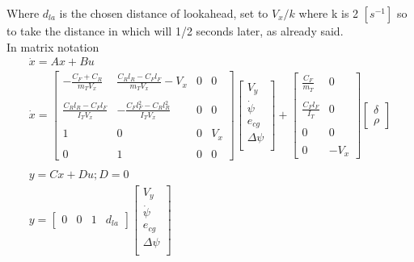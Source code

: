\documentclass{report}
\begin{document}
Where $d_{la}$ is the chosen distance of lookahead, set to $V_x/k$ where k is 2 $[s^{-1}]$ so to take the distance in which will 1/2 seconds later, as already said.
\\In matrix notation
\begin{equation}
\begin{aligned}
\dot{x} = A x + B u \\
\dot{x} = 
\begin{bmatrix}
    -\frac{C_F + C_R}{m_T V_x} & \frac{C_R l_R - C_F l_F}{m_T V_x} - V_x & 0 & 0\\\\
    \frac{C_R l_R - C_F l_F}{I_T V_x} & - \frac{C_F l_F^2 - C_R l_R^2}{I_T V_x}  & 0 & 0 \\\\
    1 & 0 & 0 & V_x \\\\
    0 & 1 & 0 & 0
\end{bmatrix}
\begin{bmatrix}
    V_y \\
    \dot{\psi}\\
    e_{cg}\\
    \Delta\psi\\
\end{bmatrix}
+
\begin{bmatrix}
    \frac{C_F}{m_T} & 0\\\\
    \frac{C_F l_F}{I_T} & 0\\\\
    0 & 0\\\\
    0 & -V_x
\end{bmatrix}
\begin{bmatrix}
    \delta\\
    \rho
\end{bmatrix}\\\\
y = C x + D u; D = 0\\
y = 
\begin{bmatrix}
    0 & 0 & 1 & d_{la}
\end{bmatrix}
\begin{bmatrix}
    V_y \\
    \dot{\psi}\\
    e_{cg}\\
    \Delta\psi\\
\end{bmatrix}
\end{aligned}
\end{equation}
\end{document}
